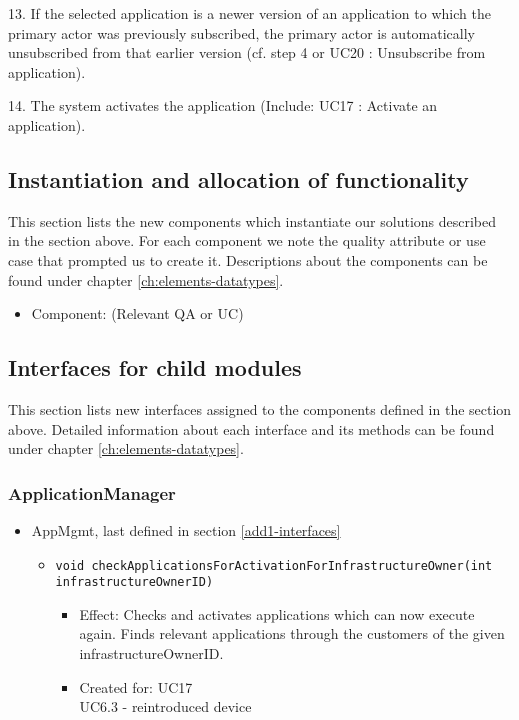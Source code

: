 {{{            13. If the selected application is a newer version of an application to which the primary actor was previously subscribed,
                the primary actor is automatically unsubscribed from that earlier version (cf. step 4 or UC20 : Unsubscribe from application).

            14. The system activates the application (Include: UC17 : Activate an application).


\subsection{Instantiation and allocation of functionality}
    This section lists the new components which instantiate our solutions
    described in the section above. For each component we note the quality
    attribute or use case that prompted us to create it. Descriptions about
    the components can be found under chapter \ref{ch:elements-datatypes}. \\

    \begin{itemize}
        \item Component: (Relevant QA or UC)
    \end{itemize}


\subsection{Interfaces for child modules}
    This section lists new interfaces assigned to the components defined
    in the section above. Detailed information about each interface and
    its methods can be found under chapter \ref{ch:elements-datatypes}. \\

    \subsubsection{ApplicationManager}
        \begin{itemize}
            \item AppMgmt, last defined in section \ref{add1-interfaces}
                \begin{itemize}
                    \item \texttt{void checkApplicationsForActivationForInfrastructureOwner(int infrastructureOwnerID)}
                        \begin{itemize}
                			\item Effect: Checks and activates applications which can now execute again. Finds relevant applications through the customers of the given infrastructureOwnerID.
                			\item Created for: UC17 \\ UC6.3 - reintroduced device
                        \end{itemize}
                \end{itemize}


\end{itemize}}}}
